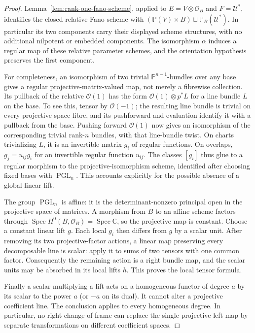 \documentclass[11pt,reqno]{amsart}
\numberwithin{equation}{section}
\theoremstyle{definition}\newtheorem{definition}[theorem]{Definition}
\theoremstyle{remark}\newtheorem{remark}[theorem]{Remark}
\newcommand{\C}{\mathbb C}\newcommand{\Q}{\mathbb Q}
\newcommand{\Pj}{\mathbb P}\newcommand{\A}{\mathbb A}
\newcommand{\OO}{\mathcal O}\newcommand{\II}{\mathcal I}
\DeclareMathOperator{\Spec}{Spec}\DeclareMathOperator{\PGL}{PGL}
\begin{document}
\begin{proof}
Lemma~\ref{lem:rank-one-fano-scheme}, applied to
\(E=V\otimes\OO_B\) and \(F=\mathcal U^*\), identifies the
closed relative Fano scheme with
\((\Pj(V)\times B)\sqcup\Pj_B(\mathcal U^*)\).
In particular its two components carry their displayed scheme structures,
with no additional nilpotent or embedded components.
The isomorphism \(\alpha\) induces a regular map of these relative
parameter schemes, and the orientation hypothesis preserves the
first component.

For completeness, an isomorphism of two trivial \(\Pj^{n-1}\)-bundles
over any base gives a regular projective-matrix-valued map, not
merely a fibrewise collection.  Its pullback of the relative
\(\OO(1)\) has the form \(\OO(1)\otimes p^*L\) for a line
bundle \(L\) on the base.  To see this, tensor by \(\OO(-1)\);
the resulting line bundle is trivial on every projective-space
fibre, and its pushforward and evaluation identify it with a
pullback from the base.  Pushing forward \(\OO(1)\) now gives
an isomorphism of the corresponding trivial rank-\(n\) bundles,
with that line-bundle twist.  On charts trivializing \(L\), it
is an invertible matrix \(g_i\) of regular functions.  On overlaps,
\(g_j=u_{ij}g_i\) for an invertible regular function \(u_{ij}\).
The classes \([g_i]\) thus glue to a regular morphism to the
projective-isomorphism scheme, identified after choosing fixed
bases with \(\PGL_n\).  This accounts explicitly for the possible
absence of a global linear lift.

The group \(\PGL_n\) is affine: it is the determinant-nonzero
principal open in the projective space of matrices.  A morphism
from \(B\) to an affine scheme factors through
\(\Spec H^0(B,\OO_B)=\Spec\C\), so the projective map is constant.
Choose a constant linear lift \(g\).  Each local \(g_i\) then
differs from \(g\) by a scalar unit.  After removing its two
projective-factor actions, a linear map preserving every
decomposable line is scalar: apply it to sums of two tensors with
one common factor.  Consequently the remaining action is a right
bundle map, and the scalar units may be absorbed in its local
lifts \(h\).  This proves the local tensor formula.

Finally a scalar multiplying a lift acts on a homogeneous functor
of degree \(a\) by its scalar to the power \(a\) (or \(-a\)
on its dual).  It cannot alter a projective coefficient line.
The conclusion applies to every homogeneous degree.  In particular,
no right change of frame can replace the single projective left map
by separate transformations on different coefficient spaces.
\end{proof}
\end{document}
